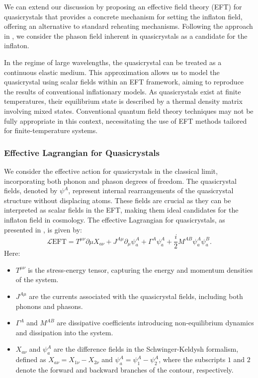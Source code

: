 \documentclass[sn-mathphys-num]{sn-jnl}%
\begin{document}
We can extend our discussion by proposing an effective field theory (EFT) for quasicrystals that provides a concrete mechanism for setting the inflaton field, offering an alternative to standard reheating mechanisms. Following the approach in \cite{Baggioli:2020haa}, we consider the phason field inherent in quasicrystals as a candidate for the inflaton.

In the regime of large wavelengths, the quasicrystal can be treated as a continuous elastic medium. This approximation allows us to model the quasicrystal using scalar fields within an EFT framework, aiming to reproduce the results of conventional inflationary models. As quasicrystals exist at finite temperatures, their equilibrium state is described by a thermal density matrix involving mixed states. Conventional quantum field theory techniques may not be fully appropriate in this context, necessitating the use of EFT methods tailored for finite-temperature systems.

\subsubsection{Effective Lagrangian for Quasicrystals}

We consider the effective action for quasicrystals in the classical limit, incorporating both phonon and phason degrees of freedom. The quasicrystal fields, denoted by $\psi^A$, represent internal rearrangements of the quasicrystal structure without displacing atoms. These fields are crucial as they can be interpreted as scalar fields in the EFT, making them ideal candidates for the inflaton field in cosmology.
The effective Lagrangian for quasicrystals, as presented in \cite{Baggioli:2020haa}, is given by:
\begin{equation} \mathcal{L}{\text{EFT}} = T^{\mu\nu} \partial\mu X_{a\nu} + J^{A\mu} \partial_\mu \psi_a^A + \Gamma^A \psi_a^A + \frac{i}{2} M^{AB} \psi_a^A \psi_a^B. \label{eqEFTLagrangian} 
\end{equation}
Here:
\begin{itemize} 
\item $T^{\mu\nu}$ is the stress-energy tensor, capturing the energy and momentum densities of the system. \item $J^{A\mu}$ are the currents associated with the quasicrystal fields, including both phonons and phasons. 
\item $\Gamma^A$ and $M^{AB}$ are dissipative coefficients introducing non-equilibrium dynamics and dissipation into the system. 
\item $X_{a\nu}$ and $\psi_a^A$ are the difference fields in the Schwinger-Keldysh formalism, defined as $X_{a\nu} = X_{1\nu} - X_{2\nu}$ and $\psi_a^A = \psi_1^A - \psi_2^A$, where the subscripts $1$ and $2$ denote the forward and backward branches of the contour, respectively. 
\end{itemize}
\end{document}
